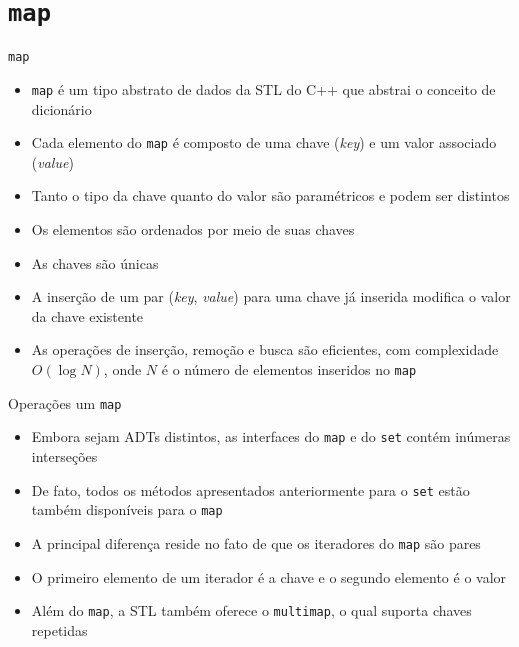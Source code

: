 \section{\texttt{map}}

\begin{frame}[fragile]{\texttt{map}}

    \begin{itemize}
        \item \texttt{map} é um tipo abstrato de dados da STL do C++ que abstrai o conceito de
            dicionário

        \item Cada elemento do \texttt{map} é composto de uma chave (\textit{key}) e um valor
            associado (\textit{value})

        \item Tanto o tipo da chave quanto do valor são paramétricos e podem ser distintos

        \item Os elementos são ordenados por meio de suas chaves

        \item As chaves são únicas

        \item A inserção de um par (\textit{key}, \textit{value}) para uma chave já inserida 
            modifica o valor da chave existente

        \item As operações de inserção, remoção e busca são eficientes, com complexidade
            $O(\log N)$, onde $N$ é o número de elementos inseridos no \texttt{map}
    \end{itemize}

\end{frame}

\begin{frame}[fragile]{Operações um \texttt{map}}

    \begin{itemize}
        \item Embora sejam ADTs distintos, as interfaces do \texttt{map} e do \texttt{set}
            contém inúmeras interseções

        \item De fato, todos os métodos apresentados anteriormente para o \texttt{set} estão
            também disponíveis para o \texttt{map}

        \item A principal diferença reside no fato de que os iteradores do \texttt{map} são
            pares 

        \item O primeiro elemento de um iterador é a chave e o segundo elemento é o valor

        \item Além do \texttt{map}, a STL também oferece o \texttt{multimap}, o qual suporta
            chaves repetidas
            
    \end{itemize}

\end{frame}

